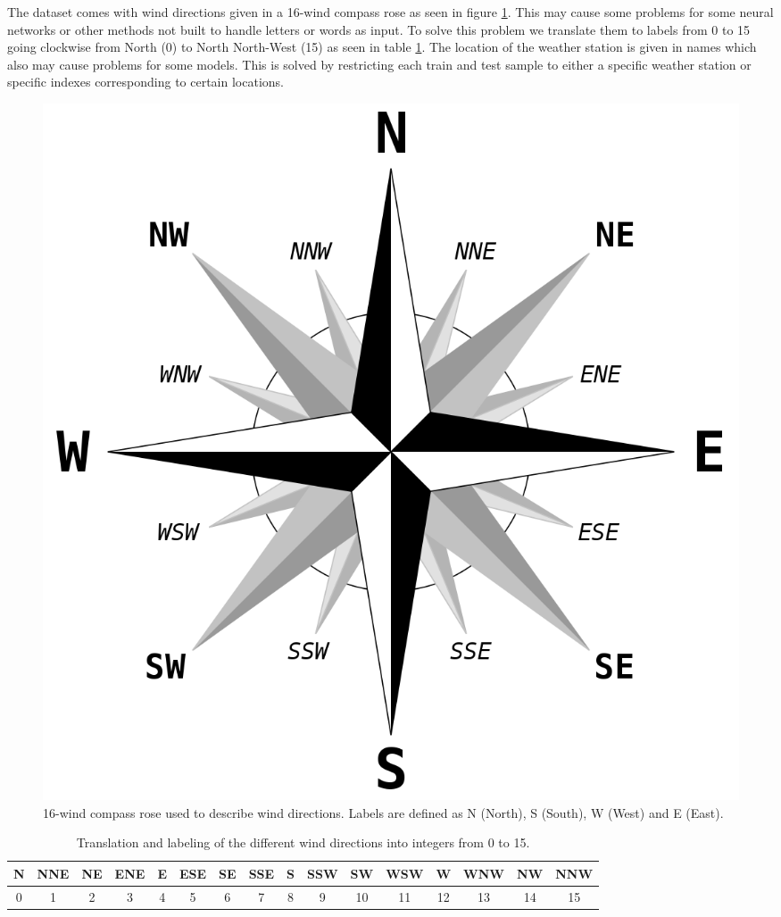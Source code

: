 \documentclass[11pt]{article}
\begin{document}
The dataset comes with wind directions given in a 16-wind compass rose as seen in figure \ref{fig:compass}. This may cause some problems for some neural networks or other methods not built to handle letters or words as input. To solve this problem we translate them to labels from 0 to 15 going clockwise from North (0) to North North-West (15) as seen in table \ref{tab:compass}. The location of the weather station is given in names which also may cause problems for some models. This is solved by restricting each train and test sample to either a specific weather station or specific indexes corresponding to certain locations.
\begin{figure}[H]
    \centering
    \includegraphics[width=.3\textwidth]{../figures/Brosen_windrose.png}
    \caption{16-wind compass rose used to describe wind directions. Labels are defined as N (North), S (South), W (West) and E (East).}
    \label{fig:compass}
\end{figure}
\begin{table}[H]
    \begin{small}
        \caption{Translation and labeling of the different wind directions into integers from 0 to 15.}
        \label{tab:compass}
        \begin{center}
            \begin{tabular}{|c|c|c|c|c|c|c|c|c|c|c|c|c|c|c|c|}
                \hline
                N & NNE & NE & ENE & E & ESE & SE & SSE & S & SSW & SW & WSW & W  & WNW & NW & NNW \\
                \hline
                0 & 1   & 2  & 3   & 4 & 5   & 6  & 7   & 8 & 9   & 10 & 11  & 12 & 13  & 14 & 15  \\
                \hline
            \end{tabular}
        \end{center}
    \end{small}
\end{table}
\end{document}
